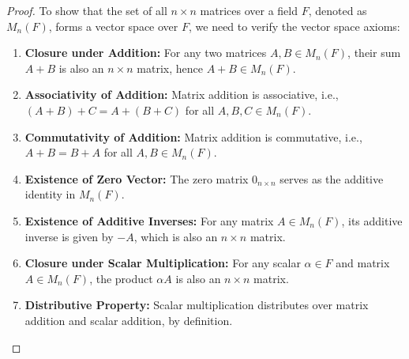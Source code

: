 \documentclass[openany]{book}
\begin{document}
\begin{proof}
    To show that the set of all $n \times n$ matrices over a field $F$, denoted as $M_n(F)$, forms a vector space over $F$, we need to verify the vector space axioms:
    \begin{enumerate}
        \item \textbf{Closure under Addition:} For any two matrices $A, B \in M_n(F)$, their sum $A + B$ is also an $n \times n$ matrix, hence $A + B \in M_n(F)$.
        
        \item \textbf{Associativity of Addition:} Matrix addition is associative, i.e., $(A + B) + C = A + (B + C)$ for all $A, B, C \in M_n(F)$.
        
        \item \textbf{Commutativity of Addition:} Matrix addition is commutative, i.e., $A + B = B + A$ for all $A, B \in M_n(F)$.
        
        \item \textbf{Existence of Zero Vector:} The zero matrix $0_{n \times n}$ serves as the additive identity in $M_n(F)$.
        
        \item \textbf{Existence of Additive Inverses:} For any matrix $A \in M_n(F)$, its additive inverse is given by $-A$, which is also an $n \times n$ matrix.
        
        \item \textbf{Closure under Scalar Multiplication:} For any scalar $\alpha \in F$ and matrix $A \in M_n(F)$, the product $\alpha A$ is also an $n \times n$ matrix.
        
        \item \textbf{Distributive Property:} Scalar multiplication distributes over matrix addition and scalar addition, by definition. 
        

\end{enumerate}
\end{proof}
\end{document}
